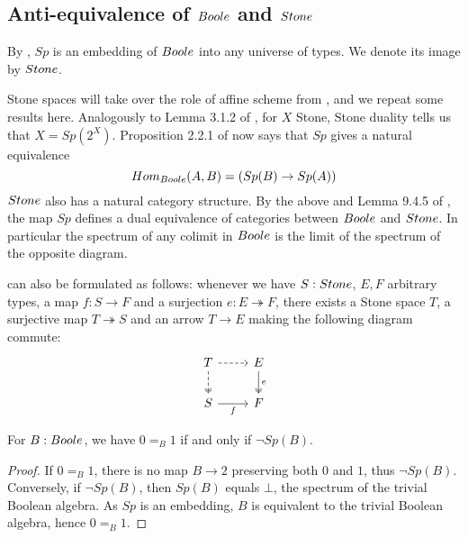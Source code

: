 \subsection{Anti-equivalence of $\Boole$ and $\Stone$}
By , $Sp$ is an embedding of $\Boole$ into any universe of types. 
We denote its image by $\Stone$. 

\begin{remark}\label{SpIsAntiEquivalence}
Stone spaces will take over the role of affine scheme from \cite{draft}, 
and we repeat some results here. 
Analogously to Lemma 3.1.2 of \cite{draft}, 
for $X$ Stone, Stone duality tells us that $X = Sp(2^X)$. 
%
Proposition 2.2.1 of \cite{draft} now says that 
$Sp$ gives a natural equivalence 
\[
   Hom_{\Boole} (A, B) = (Sp(B) \to Sp(A))
\]
%
$\Stone$ also has a natural category structure.
By the above and Lemma 9.4.5 of \cite{hott}, 
the map $Sp$ defines a dual equivalence of categories between $\Boole$ and $\Stone$.
In particular the spectrum of any colimit in $\Boole$ is the limit of 
the spectrum of the opposite diagram. 
\end{remark}
\begin{remark}\label{LocalChoiceSurjectionForm}
   can also be formulated as follows:
  whenever we have $S:\Stone$, $E,F$ arbitrary types, a map $f:S \to F$ and a 
  surjection $e:E \twoheadrightarrow F$, 
  there exists a Stone space $T$, a surjective map 
  $T\twoheadrightarrow S$ and an arrow $T\to E$ making the following diagram commute:
    \[\begin{tikzcd}
      T \arrow[d,dashed, two heads ] \arrow[r,dashed]&  E \arrow[d,""',two heads, "e"]\\
      S  \arrow[r, swap,"f"] & F
    \end{tikzcd}\]  
\end{remark}

\begin{lemma}\label{SpectrumEmptyIff01Equal}
  For $B:\Boole$, we have $0=_B1$ if and only if $\neg Sp(B)$.
\end{lemma}
\begin{proof}
  If $0=_B1$, there is no map $B\to 2$ preserving both $0$ and $1$, thus $\neg Sp(B)$. 
  Conversely, if $\neg Sp(B)$, then 
  $Sp(B)$ equals $\bot$, the spectrum of the trivial Boolean algebra. 
  As $Sp$ is an embedding, $B$ is equivalent to the trivial Boolean algebra, hence $0=_B1$. 
\end{proof}

